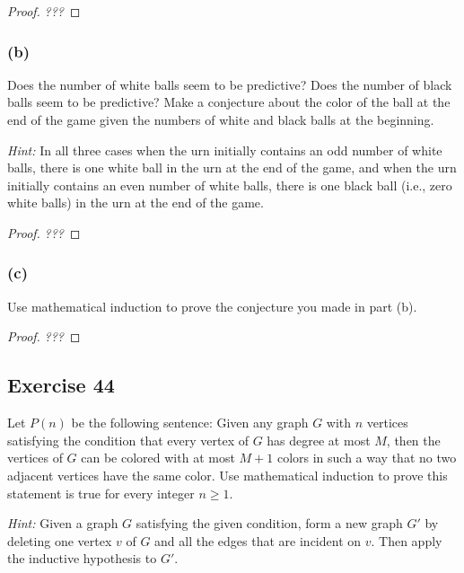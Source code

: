 \documentclass[14pt]{extarticle}
\begin{document}
\begin{proof}
    {\it ???}
\end{proof}

\subsubsection{(b)}
Does the number of white balls seem to be predictive? Does the number of black balls seem to be predictive? Make a conjecture about the color of the ball at the end of the game given the numbers of white and black balls at the beginning.

    {\it Hint:} In all three cases when the urn initially contains an odd number of white balls, there is one white ball in the urn at the end of the game, and when the urn initially contains an even number of white balls, there is one black ball (i.e., zero white balls) in the urn at the end of the game.

\begin{proof}
    {\it ???}
\end{proof}

\subsubsection{(c)}
Use mathematical induction to prove the conjecture you made in part (b).

\begin{proof}
    {\it ???}
\end{proof}

\subsection{Exercise 44}
Let $P(n)$ be the following sentence: Given any graph $G$ with $n$ vertices satisfying the condition that every vertex of $G$ has degree at most $M$, then the vertices of $G$ can be colored with at most $M + 1$ colors in such a way that no two adjacent vertices have the same color. Use mathematical induction to prove this statement is true for every integer $n \geq 1$.

    {\it Hint:} Given a graph $G$ satisfying the given condition, form a new graph $G'$ by deleting one vertex $v$ of $G$ and all the edges that are incident on $v$. Then apply the inductive hypothesis to $G'$.
\end{document}
